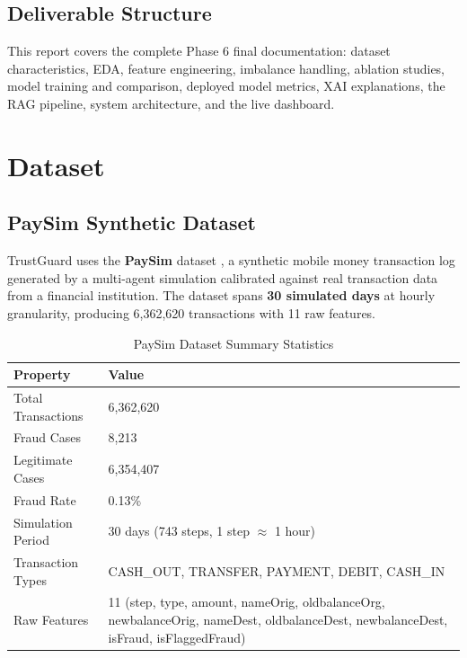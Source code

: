 \documentclass[12pt,a4paper]{article}
\begin{document}
\subsection{Deliverable Structure}

This report covers the complete Phase 6 final documentation: dataset characteristics, EDA, feature engineering, imbalance handling, ablation studies, model training and comparison, deployed model metrics, XAI explanations, the RAG pipeline, system architecture, and the live dashboard.

\section{Dataset}

\subsection{PaySim Synthetic Dataset}

TrustGuard uses the \textbf{PaySim} dataset \cite{paysim}, a synthetic mobile money transaction log generated by a multi-agent simulation calibrated against real transaction data from a financial institution. The dataset spans \textbf{30 simulated days} at hourly granularity, producing 6,362,620 transactions with 11 raw features.

\begin{table}[H]
\centering
\caption{PaySim Dataset Summary Statistics}
\label{tab:dataset_summary}
\begin{tabular}{lp{9cm}}
\toprule
\textbf{Property} & \textbf{Value} \\
\midrule
Total Transactions & 6,362,620 \\
Fraud Cases & 8,213 \\
Legitimate Cases & 6,354,407 \\
Fraud Rate & 0.13\% \\
Simulation Period & 30 days (743 steps, 1 step $\approx$ 1 hour) \\
Transaction Types & CASH\_OUT, TRANSFER, PAYMENT, DEBIT, CASH\_IN \\
Raw Features & 11 (step, type, amount, nameOrig, oldbalanceOrg, newbalanceOrig, nameDest, oldbalanceDest, newbalanceDest, isFraud, isFlaggedFraud) \\
\bottomrule
\end{tabular}
\end{table}
\end{document}

